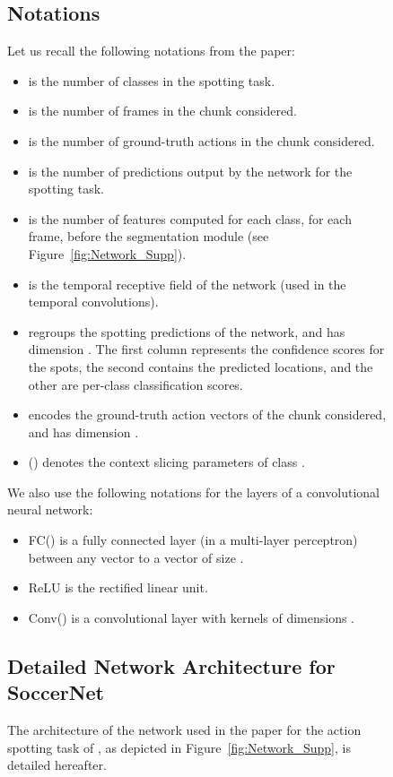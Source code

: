 \documentclass[10pt,twocolumn,letterpaper]{article}
\begin{document}
\begin{figure}[t]
{\begin{minipage}{\linewidth}
\subsection{Notations}
Let us recall the following notations from the paper:
\begin{itemize}
    \item  is the number of classes in the spotting task.
    \item  is the number of frames in the chunk considered.
    \item  is the number of ground-truth actions in the chunk considered.
    \item  is the number of predictions output by the network for the spotting task.
    \item  is the number of features computed for each class, for each frame, before the segmentation module (see Figure~\ref{fig:Network_Supp}).
    \item  is the temporal receptive field of the network (used in the temporal convolutions).
    \item  regroups the spotting predictions of the network, and has  dimension . The first column represents the confidence scores for the spots, the second contains the predicted locations, and the other are per-class classification scores.
    \item  encodes the ground-truth action vectors of the chunk considered, and has dimension . 
    \item  () denotes the context slicing parameters of class .
\end{itemize}

We also use the following notations for the layers of a convolutional neural network:
\begin{itemize}
    \item FC() is a fully connected layer (\eg in a multi-layer perceptron) between any vector to a vector of size . 
    \item ReLU is the rectified linear unit.
    \item Conv() is a convolutional layer with  kernels of dimensions .
\end{itemize}




\subsection{Detailed Network Architecture for SoccerNet}

The architecture of the network used in the paper for the action spotting task of \SoccerNet, as depicted in Figure~\ref{fig:Network_Supp}, is detailed hereafter.


\end{minipage}}
\end{figure}
\end{document}
